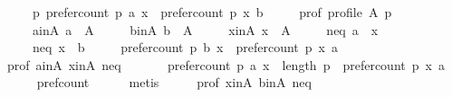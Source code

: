\begin{isabellebody}
\ \ \ \ \ p{}{\isacharcolon}{\kern0pt}\ {\isachardoublequoteopen}prefer{\isacharunderscore}{\kern0pt}count\ p\ a\ x\ {\isasymge}\ prefer{\isacharunderscore}{\kern0pt}count\ p\ x\ b{\isachardoublequoteclose}\isanewline
\ \ \ \ \ prof{\isacharcolon}{\kern0pt}\ {\isachardoublequoteopen}profile\ A\ p{\isachardoublequoteclose}\isanewline
\ \ \ \ \ a{\isacharunderscore}{\kern0pt}in{\isacharunderscore}{\kern0pt}A{\isacharcolon}{\kern0pt}\ {\isachardoublequoteopen}a\ {\isasymin}\ A{\isachardoublequoteclose}\isanewline
\ \ \ \ \ b{\isacharunderscore}{\kern0pt}in{\isacharunderscore}{\kern0pt}A{\isacharcolon}{\kern0pt}\ {\isachardoublequoteopen}b\ {\isasymin}\ A{\isachardoublequoteclose}\isanewline
\ \ \ \ \ x{\isacharunderscore}{\kern0pt}in{\isacharunderscore}{\kern0pt}A{\isacharcolon}{\kern0pt}\ {\isachardoublequoteopen}x\ {\isasymin}\ A{\isachardoublequoteclose}\isanewline
\ \ \ \ \ neq{}{\isacharcolon}{\kern0pt}\ {\isachardoublequoteopen}a\ {\isasymnoteq}\ x{\isachardoublequoteclose}\isanewline
\ \ \ \ \ neq{}{\isacharcolon}{\kern0pt}\ {\isachardoublequoteopen}x\ {\isasymnoteq}\ b{\isachardoublequoteclose}\isanewline
\ \ \ \ \ {\isachardoublequoteopen}prefer{\isacharunderscore}{\kern0pt}count\ p\ b\ x\ {\isasymge}\ prefer{\isacharunderscore}{\kern0pt}count\ p\ x\ a{\isachardoublequoteclose}\isanewline
%
\isadelimproof
%
\endisadelimproof
%
\isatagproof
{}\isamarkupfalse%
\ {\isacharminus}{\kern0pt}\isanewline
\ \ \isamarkupfalse%
\ prof\ a{\isacharunderscore}{\kern0pt}in{\isacharunderscore}{\kern0pt}A\ x{\isacharunderscore}{\kern0pt}in{\isacharunderscore}{\kern0pt}A\ neq{}\ \isamarkupfalse%
\ {}{\isacharcolon}{\kern0pt}\isanewline
\ \ \ \ {\isachardoublequoteopen}prefer{\isacharunderscore}{\kern0pt}count\ p\ a\ x\ {\isacharequal}{\kern0pt}\ {\isacharparenleft}{\kern0pt}length\ p{\isacharparenright}{\kern0pt}\ {\isacharminus}{\kern0pt}\ {\isacharparenleft}{\kern0pt}prefer{\isacharunderscore}{\kern0pt}count\ p\ x\ a{\isacharparenright}{\kern0pt}{\isachardoublequoteclose}\isanewline
\ \ \ \ \isamarkupfalse%
\ pref{\isacharunderscore}{\kern0pt}count\isanewline
\ \ \ \ \isamarkupfalse%
\ metis\isanewline
\ \ \isamarkupfalse%
\ \isamarkupfalse%
\ prof\ x{\isacharunderscore}{\kern0pt}in{\isacharunderscore}{\kern0pt}A\ b{\isacharunderscore}{\kern0pt}in{\isacharunderscore}{\kern0pt}A\ neq{}\ \isamarkupfalse%

\end{isabellebody}
